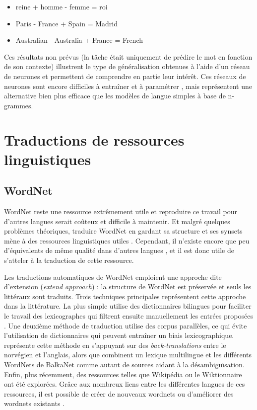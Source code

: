 \begin{itemize}
    \item reine + homme - femme = roi
    \item Paris - France + Spain = Madrid
    \item Australian - Australia + France = French
\end{itemize}

Ces résultats non prévus (la tâche était uniquement de prédire le mot en
fonction de son contexte) illustrent le type de généralisation obtenues à
l'aide d'un réseau de neurones et permettent de comprendre en partie leur
intérêt. Ces réseaux de neurones sont encore difficiles à entraîner et à
paramétrer \citep{do2014modeles}, mais représentent une alternative bien plus
efficace que les modèles de langue simples à base de n-grammes.

\section{Traductions de ressources linguistiques}
\label{sec:translation}

\subsection{WordNet}

WordNet reste une ressource extrêmement utile et reproduire ce travail pour
d'autres langues serait coûteux et difficile à maintenir. Et malgré quelques
problèmes théoriques, traduire WordNet en gardant sa structure et ses synsets
mène à des ressources linguistiques utiles
\citep{fellbaum2007connecting,demelo2008utility}. Cependant, il n'existe encore
que peu d'équivalents de même qualité dans d'autres langues
\citep{bond2012survey}, et il est donc utile de s'atteler à la traduction de
cette ressource.

Les traductions automatiques de WordNet emploient une approche dite d'extension
(\textit{extend approach}) : la structure de WordNet est préservée et seuls les
littéraux sont traduits. Trois techniques principales représentent cette
approche dans la littérature. La plus simple utilise des dictionnaires
bilingues pour faciliter le travail des lexicographes qui filtrent ensuite
manuellement les entrées proposées
\citep{vossen1998eurowordnet,pianta2002developing,tufis2004balkanet}. Une
deuxième méthode de traduction utilise des corpus parallèles, ce qui évite
l'utilisation de dictionnaires qui peuvent entraîner un biais lexicographique.
\cite{dyvik2004translations} représente cette méthode en s'appuyant sur des
\textit{back-translations} entre le norvégien et l'anglais, alors que
\citep{sagot2008construction} combinent un lexique multilingue et les
différents WordNets de BalkaNet comme autant de sources aidant à la
désambiguïsation. Enfin, plus récemment, des ressources telles que Wikipédia ou
le Wiktionnaire ont été explorées. Grâce aux nombreux liens entre les
différentes langues de ces ressources, il est possible de créer de nouveaux
wordnets \citep{demelo2009towards,navigli2010babelnet} ou d'améliorer des
wordnets existants \citep{hanoka2012wordnet}.

